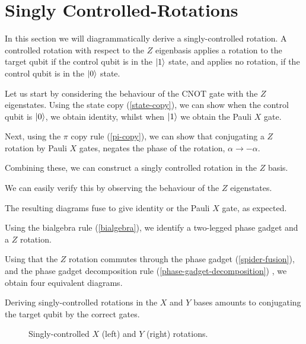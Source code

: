 \section{Singly Controlled-Rotations}

In this section we will diagrammatically derive a singly-controlled rotation. A controlled rotation with respect to the $Z$ eigenbasis applies a rotation to the target qubit if the control qubit is in the $\ket 1$ state, and applies no rotation, if the control qubit is in the $\ket 0$ state.

Let us start by considering the behaviour of the CNOT gate with the $Z$ eigenstates. Using the state copy (\ref{state-copy}), we can show when the control qubit is $\ket 0$, we obtain identity, whilst when $\ket 1$ we obtain the Pauli $X$ gate.


Next, using the $\pi$ copy rule (\ref{pi-copy}), we can show that conjugating a $Z$ rotation by Pauli $X$ gates, negates the phase of the rotation, $\alpha \rightarrow -\alpha$.


Combining these, we can construct a singly controlled rotation in the $Z$ basis.


We can easily verify this by observing the behaviour of the $Z$ eigenstates.



The resulting diagrams fuse to give identity or the Pauli $X$ gate, as expected.


Using the bialgebra rule (\ref{bialgebra}), we identify a two-legged phase gadget and a $Z$ rotation.


Using that the $Z$ rotation commutes through the phase gadget (\ref{spider-fusion}), and the phase gadget decomposition rule (\ref{phase-gadget-decomposition}) , we obtain four equivalent diagrams. 


Deriving singly-controlled rotations in the $X$ and $Y$ bases amounts to conjugating the target qubit by the correct gates.

\begin{figure}[H]
    \centering
    \caption{Singly-controlled $X$ (left) and $Y$ (right) rotations.}
\end{figure}


